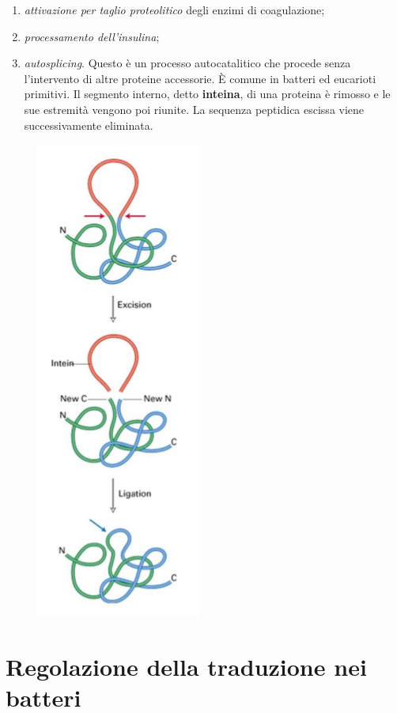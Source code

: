 \documentclass[11pt]{book}
\begin{document}
\begin{itemize}
  \begin{enumerate}
  \def\labelenumi{\arabic{enumi}.}
  \itemsep1pt\parskip0pt
  \item
    \emph{attivazione per taglio proteolitico} degli enzimi di
    coagulazione;
  \item
    \emph{processamento dell'insulina};
  \item
    \emph{autosplicing}. Questo è un processo autocatalitico che procede
    senza l'intervento di altre proteine accessorie. È comune in
    batteri ed eucarioti primitivi. Il segmento interno, detto
    \textbf{inteina}, di una proteina è rimosso e le sue estremità
    vengono poi riunite. La sequenza peptidica escissa viene
    successivamente eliminata.
  \end{enumerate}
\end{itemize}

\begin{figure}[htp]
\centering
\includegraphics[scale=1.00]{img/62_Autosplicing.png}
\caption{}
\label{autosplicing}
\end{figure}

\section{Regolazione della traduzione nei
batteri}\label{regolazione-della-traduzione-nei-batteri}
\end{document}
